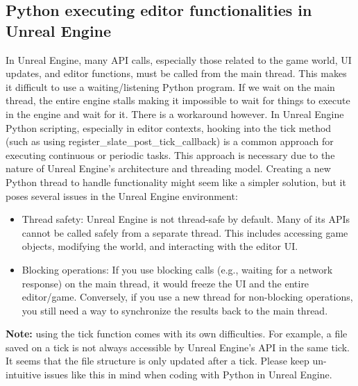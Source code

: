 \documentclass{uva-inf-article}
\begin{document}
\subsection{Python executing editor functionalities in Unreal Engine}\label{PyUE}
In Unreal Engine, many API calls, especially those related to the game world, UI updates, and editor functions, must be called from the main thread. This makes it difficult to use a waiting/listening Python program. If we wait on the main thread, the entire engine stalls making it impossible to wait for things to execute in the engine and wait for it. There is a workaround however. In Unreal Engine Python scripting, especially in editor contexts, hooking into the tick method (such as using register\_slate\_post\_tick\_callback) is a common approach for executing continuous or periodic tasks. This approach is necessary due to the nature of Unreal Engine's architecture and threading model.
Creating a new Python thread to handle functionality might seem like a simpler solution, but it poses several issues in the Unreal Engine environment:
\begin{itemize}
    \item Thread safety: Unreal Engine is not thread-safe by default. Many of its APIs cannot be called safely from a separate thread. This includes accessing game objects, modifying the world, and interacting with the editor UI.
    \item Blocking operations: If you use blocking calls (e.g., waiting for a network response) on the main thread, it would freeze the UI and the entire editor/game. Conversely, if you use a new thread for non-blocking operations, you still need a way to synchronize the results back to the main thread.
\end{itemize}

\textbf{Note:} using the tick function comes with its own difficulties. For example, a file saved on a tick is not always accessible by Unreal Engine's API in the same tick. It seems that the file structure is only updated after a tick. Please keep un-intuitive issues like this in mind when coding with Python in Unreal Engine.
\end{document}

